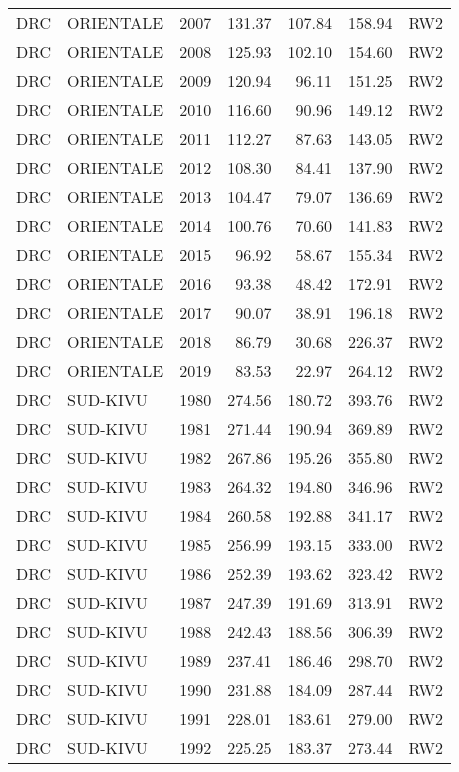 \begin{longtable}{lllrrrl}
  DRC & ORIENTALE & 2007 & 131.37 & 107.84 & 158.94 & RW2 \\ 
  DRC & ORIENTALE & 2008 & 125.93 & 102.10 & 154.60 & RW2 \\ 
  DRC & ORIENTALE & 2009 & 120.94 & 96.11 & 151.25 & RW2 \\ 
  DRC & ORIENTALE & 2010 & 116.60 & 90.96 & 149.12 & RW2 \\ 
  DRC & ORIENTALE & 2011 & 112.27 & 87.63 & 143.05 & RW2 \\ 
  DRC & ORIENTALE & 2012 & 108.30 & 84.41 & 137.90 & RW2 \\ 
  DRC & ORIENTALE & 2013 & 104.47 & 79.07 & 136.69 & RW2 \\ 
  DRC & ORIENTALE & 2014 & 100.76 & 70.60 & 141.83 & RW2 \\ 
  DRC & ORIENTALE & 2015 & 96.92 & 58.67 & 155.34 & RW2 \\ 
  DRC & ORIENTALE & 2016 & 93.38 & 48.42 & 172.91 & RW2 \\ 
  DRC & ORIENTALE & 2017 & 90.07 & 38.91 & 196.18 & RW2 \\ 
  DRC & ORIENTALE & 2018 & 86.79 & 30.68 & 226.37 & RW2 \\ 
  DRC & ORIENTALE & 2019 & 83.53 & 22.97 & 264.12 & RW2 \\ 
  DRC & SUD-KIVU & 1980 & 274.56 & 180.72 & 393.76 & RW2 \\ 
  DRC & SUD-KIVU & 1981 & 271.44 & 190.94 & 369.89 & RW2 \\ 
  DRC & SUD-KIVU & 1982 & 267.86 & 195.26 & 355.80 & RW2 \\ 
  DRC & SUD-KIVU & 1983 & 264.32 & 194.80 & 346.96 & RW2 \\ 
  DRC & SUD-KIVU & 1984 & 260.58 & 192.88 & 341.17 & RW2 \\ 
  DRC & SUD-KIVU & 1985 & 256.99 & 193.15 & 333.00 & RW2 \\ 
  DRC & SUD-KIVU & 1986 & 252.39 & 193.62 & 323.42 & RW2 \\ 
  DRC & SUD-KIVU & 1987 & 247.39 & 191.69 & 313.91 & RW2 \\ 
  DRC & SUD-KIVU & 1988 & 242.43 & 188.56 & 306.39 & RW2 \\ 
  DRC & SUD-KIVU & 1989 & 237.41 & 186.46 & 298.70 & RW2 \\ 
  DRC & SUD-KIVU & 1990 & 231.88 & 184.09 & 287.44 & RW2 \\ 
  DRC & SUD-KIVU & 1991 & 228.01 & 183.61 & 279.00 & RW2 \\ 
  DRC & SUD-KIVU & 1992 & 225.25 & 183.37 & 273.44 & RW2 \\ 

\end{longtable}
